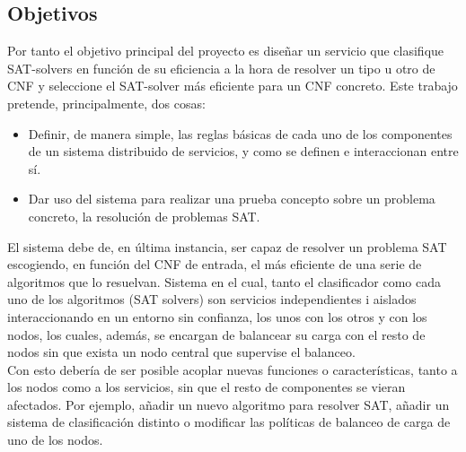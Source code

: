 \documentclass[11pt]{article}
\begin{document}
		\subsection{Objetivos}
			Por tanto el objetivo principal del proyecto es diseñar un servicio que clasifique SAT-solvers en función de su eficiencia a la hora de resolver un tipo u otro de CNF
			y seleccione el SAT-solver más eficiente para un CNF concreto.
			Este trabajo pretende, principalmente, dos cosas:
			\begin{itemize}
				\item Definir, de manera simple, 
					las reglas básicas de cada uno de los componentes de un sistema distribuido de servicios,
					y como se definen e interaccionan entre sí.
				\item Dar uso del sistema para realizar una prueba concepto sobre un problema concreto, la resolución de problemas SAT.
			\end{itemize}
			El sistema debe de, en última instancia, ser capaz de resolver un problema SAT escogiendo, en función del CNF de entrada, el más eficiente de una serie de algoritmos que lo resuelvan.
			Sistema en el cual, tanto el clasificador como cada uno de los algoritmos (SAT solvers) son servicios independientes i aislados interaccionando en un entorno sin confianza, los unos con los otros 
			y con los nodos, los cuales, además, se encargan de balancear su carga con el resto de nodos sin que exista un nodo central que supervise el balanceo. \\
	
			Con esto debería de ser posible acoplar nuevas funciones o características, tanto a los nodos como a los servicios, sin que el resto de componentes se vieran afectados. Por ejemplo, añadir un nuevo algoritmo
			para resolver SAT, añadir un sistema de clasificación distinto o modificar las políticas de balanceo de carga de uno de los nodos. \\
\end{document}
